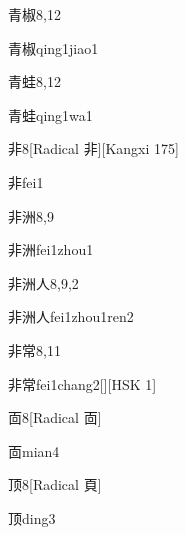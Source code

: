 \begin{entry}{青椒}{8,12}
  \begin{phonetics}{青椒}{qing1jiao1}
  \end{phonetics}
\end{entry}

\begin{entry}{青蛙}{8,12}
  \begin{phonetics}{青蛙}{qing1wa1}
  \end{phonetics}
\end{entry}

\begin{entry}{非}{8}[Radical ⾮][Kangxi 175]
  \begin{phonetics}{非}{fei1}
  \end{phonetics}
\end{entry}

\begin{entry}{非洲}{8,9}
  \begin{phonetics}{非洲}{fei1zhou1}
  \end{phonetics}
\end{entry}

\begin{entry}{非洲人}{8,9,2}
  \begin{phonetics}{非洲人}{fei1zhou1ren2}
  \end{phonetics}
\end{entry}

\begin{entry}{非常}{8,11}
  \begin{phonetics}{非常}{fei1chang2}[][HSK 1]
  \end{phonetics}
\end{entry}

\begin{entry}{靣}{8}[Radical 靣]
  \begin{phonetics}{靣}{mian4}
  \end{phonetics}
\end{entry}

\begin{entry}{顶}{8}[Radical 頁]
  \begin{phonetics}{顶}{ding3}
  \end{phonetics}
\end{entry}

